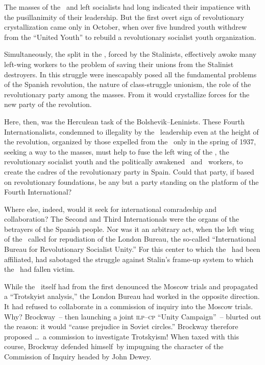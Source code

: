 \begin{sloppypar}
  The masses of the \UGT\ and left socialists had long indicated their impatience with the pusillanimity of their leadership. But the first overt sign of revolutionary crystallization came only in October\kn, when over five hundred youth withdrew from the ``United Youth'' to rebuild a revolutionary socialist youth organization.
\end{sloppypar}

Simultaneously, the split in the \UGT\kn, forced by the Stalinists, effectively awoke many left-wing workers to the problem of saving their unions from the Stalinist destroyers. In this struggle were inescapably posed all the fundamental problems of the Spanish revolution, the nature of class-struggle unionism, the role of the revolutionary party among the masses. From it would crystallize forces for the new party of the revolution.

Here, then, was the Herculean task of the Bolshevik--Leninists. These Fourth Internationalists, condemned to illegality by the \POUM\ leadership even at the height of the revolution, organized by those expelled from the \POUM\ only in the spring of 1937\kn, seeking a way to the masses, must help to fuse the left wing of the \POUM\kn, the revolutionary socialist youth and the politically awakened \CNT\ and \UGT\ workers, to create the cadres of the revolutionary party in Spain. Could that party, if based on revolutionary foundations, be any but a party standing on the platform of the Fourth International?

Where else, indeed, would it seek for international comradeship and collaboration? The Second and Third Internationals were the organs of the betrayers of the Spanish people. Nor was it an arbitrary act, when the left wing of the \POUM\ called for repudiation of the London Bureau, the so-called ``International Bureau for Revolutionary Socialist Unity.\kn\kn'' For this center to which the \POUM\ had been affiliated, had sabotaged the struggle against Stalin’s frame-up system to which the \POUM\ had fallen victim.

\begin{sloppypar}
  While the \POUM\ itself had from the first denounced the Moscow trials and propagated a ``Trotskyist analysis,\kn\kn'' the London Bureau had worked in the opposite direction. It had refused to collaborate in a commission of inquiry into the Moscow trials. Why? Brockway~-- then launching a joint \textsc{ilp–cp} ``Unity Campaign''~-- blurted out the reason: it would ``cause prejudice in Soviet circles.\kn\kn''
  Brockway therefore proposed \dots\ a commission to investigate Trotskyism! When taxed with this course, Brockway defended himself~by impugning the character of the Commission of Inquiry headed by John Dewey.
\end{sloppypar}

